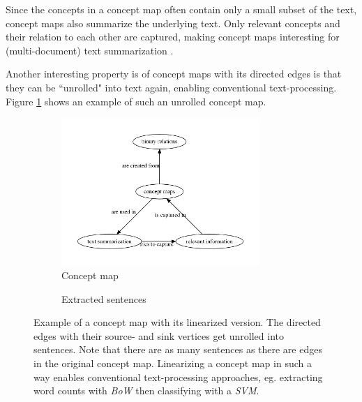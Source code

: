 Since the concepts in a concept map often contain only a small subset of the text, concept maps also summarize the underlying text.
Only relevant concepts and their relation to each other are captured, making concept maps interesting for (multi-document) text summarization \cite{Falke2017b}.

Another interesting property is of concept maps with its directed edges is that they can be ``unrolled" into text again, enabling conventional text-processing.
Figure \ref{fig:concept_map_linearization} shows an example of such an unrolled concept map.

\begin{figure}[htb!]
	\centering
	\begin{subfigure}[b]{.48\linewidth}
		\centering
		\includegraphics[height=2.2in]{assets/figures/graph_example_linearization.pdf}
		\caption{Concept map}
	\end{subfigure}
	\begin{subfigure}[b]{.48\linewidth}
		\centering
		\noindent{}
		\vspace{0.7in}
		\caption{Extracted sentences}
	\end{subfigure}%
	\caption[Example: Linearized Concept Map]{Example of a concept map with its linearized version.
		The directed edges with their source- and sink vertices get unrolled into sentences.
		Note that there are as many sentences as there are edges in the original concept map.
		Linearizing a concept map in such a way enables conventional text-processing approaches, eg. extracting word counts with \textit{BoW} then classifying with a \textit{SVM}.}
	\label{fig:concept_map_linearization}
\end{figure}


